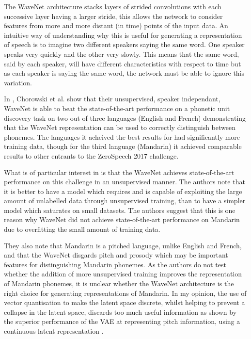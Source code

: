The WaveNet architecture stacks layers of strided convolutions with each successive layer having a larger stride, this allows the network to consider features from more and more distant (in time) points of the input data. An intuitive way of understanding why this is useful for generating a representation of speech is to imagine two different speakers saying the same word. One speaker speaks very quickly and the other very slowly. This means that the same word, said by each speaker, will have different characteristics with respect to time but as each speaker is saying the same word, the network must be able to ignore this variation.

In \cite{wavenet}, Chorowski et al. show that their unsupervised, speaker independant, WaveNet is able to beat the state-of-the-art performance on a phonetic unit discovery task \cite{dunbar2017zero} on two out of three languages (English and French) demonstrating that the WaveNet representation can be used to correctly distinguish between phonemes. The languages it acheived the best results for had significantly more training data, though for the third language (Mandarin) it achieved comparable results to other entrants to the ZeroSpeech 2017 challenge. 

What is of particular interest in \cite{wavenet} is that the WaveNet achieves state-of-the-art performance on this challenge in an unsupervised manner. The authors note that it is better to have a model which requires and is capable of exploiting the large amount of unlabelled data through unsupervised training, than to have a simpler model which saturates on small datasets. The authors suggest that this is one reason why WaveNet did not achieve state-of-the-art performance on Mandarin due to overfitting the small amount of training data.

They also note that Mandarin is a pitched language, unlike English and French, and that the WaveNet disgards pitch and prosody \cite{van2017neural} which may be important features for distinguishing Mandarin phonemes. As the authors do not test whether the addition of more unsupervised training improves the representation of Mandarin phonemes, it is unclear whether the WaveNet architecture is the right choice for generating representations of Mandarin. In my opinion, the use of vector quantisation to make the latent space discrete, whilst helping to prevent a collapse in the latent space, discards too much useful information as shown by the superior performance of the \ac{VAE} at representing pitch information, using a continuous latent representation \cite{wavenet}. 

